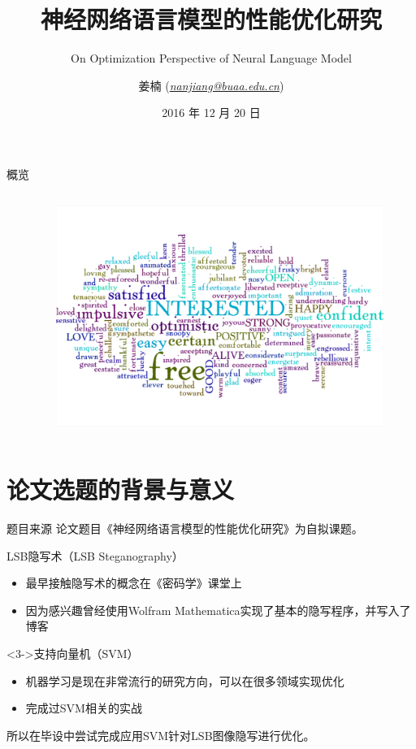 \documentclass[14pt]{Bredelebeamer}
\title[研究生开题答辩]{神经网络语言模型的性能优化研究}
\subtitle{On Optimization Perspective of Neural Language Model}
\institute[]{北京航空航天大学计算机学院研究生开题答辩}
\author[\href{mailto:nanjiang@buaa.edu.cn}{ \textit{nanjiang@buaa.edu.cn}}]{姜楠 (\href{mailto:nanjiang@buaa.edu.cn}{\textit{nanjiang@buaa.edu.cn}})}
\date{ 2016 年 12 月 20 日}
\begin{document}
\begin{frame}
  \titlepage
\end{frame}

\begin{frame}{概览}
  \begin{columns}
    \begin{column}{.5\textwidth}
        \tableofcontents
    \end{column}
    \begin{column}{.5\textwidth}
      \begin{figure}
        \centering
        \includegraphics[width=1.\textwidth]{images/word-cloud.png}
      \end{figure}
    \end{column}
  \end{columns}
\end{frame}

\section{论文选题的背景与意义}
\begin{frame}{题目来源}
  论文题目《神经网络语言模型的性能优化研究》为自拟课题。
  \pause
  \begin{alertblock}{LSB隐写术（LSB Steganography）}
    \begin{itemize}
      \item 最早接触隐写术的概念在《密码学》课堂上
      \item 因为感兴趣曾经使用Wolfram Mathematica实现了基本的隐写程序，并写入了博客
    \end{itemize}
  \end{alertblock}
  \pause
  \begin{block}<3->{支持向量机（SVM）}
    \begin{itemize}
      \item 机器学习是现在非常流行的研究方向，可以在很多领域实现优化
      \item 完成过SVM相关的实战
    \end{itemize}
  \end{block}
  \pause
  所以在毕设中尝试完成应用SVM针对LSB图像隐写进行优化。
\end{frame}
\end{document}
